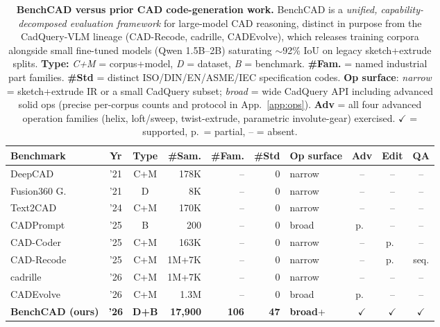 \begin{table}[t]
\centering
\small
\setlength{\tabcolsep}{5pt}
\caption{\textbf{BenchCAD versus prior CAD code-generation work.} BenchCAD is a \emph{unified, capability-decomposed evaluation framework} for large-model CAD reasoning, distinct in purpose from the CadQuery-VLM lineage (CAD-Recode, cadrille, CADEvolve), which releases training corpora alongside small fine-tuned models (Qwen 1.5B--2B) saturating $\sim$92\% IoU on legacy sketch+extrude splits. \textbf{Type:} \emph{C+M} = corpus+model, \emph{D} = dataset, \emph{B} = benchmark. \textbf{\#Fam.} = named industrial part families. \textbf{\#Std} = distinct ISO/DIN/EN/ASME/IEC specification codes. \textbf{Op surface}: \emph{narrow} = sketch+extrude IR or a small CadQuery subset; \emph{broad} = wide CadQuery API including advanced solid ops (precise per-corpus counts and protocol in App.~\ref{app:ops}). \textbf{Adv} = all four advanced operation families (helix, loft/sweep, twist-extrude, parametric involute-gear) exercised. $\checkmark$ = supported, p.\ = partial, -- = absent.}
\label{tab:cmp_prior}
\begin{tabular}{lccrrrlccc}
\toprule
Benchmark & Yr & Type & \#Sam. & \#Fam. & \#Std & Op surface & Adv & Edit & QA \\
\midrule
DeepCAD~\citep{Wu2021}                   & '21 & C+M & 178K   & -- & 0  & narrow & --  & --   & --   \\
Fusion360 G.~\citep{Willis2021fusion}    & '21 & D   & 8K     & -- & 0  & narrow & --  & --   & --   \\
Text2CAD~\citep{Khan2024}                & '24 & C+M & 170K   & -- & 0  & narrow & --  & --   & --   \\
CADPrompt~\citep{Alrashedy2025}          & '25 & B   & 200    & -- & 0  & broad  & p.\ & --   & --   \\
CAD-Coder~\citep{Guan2025}               & '25 & C+M & 163K   & -- & 0  & narrow & --  & p.\  & --   \\
CAD-Recode~\citep{Rukhovich2025}         & '25 & C+M & 1M+7K  & -- & 0  & narrow & --  & p.\  & seq.\\
cadrille~\citep{Kolodiazhnyi2026}        & '26 & C+M & 1M+7K  & -- & 0  & narrow & --  & --   & --   \\
CADEvolve~\citep{Elistratov2026}         & '26 & C+M & 1.3M   & -- & 0  & broad  & p.\ & --   & --   \\
\midrule
\textbf{BenchCAD (ours)} & \textbf{'26} & \textbf{D+B} & \textbf{17{,}900} & \textbf{106} & \textbf{47} & \textbf{broad}+ & $\checkmark$ & $\checkmark$ & $\checkmark$ \\
\bottomrule
\end{tabular}
\end{table}
